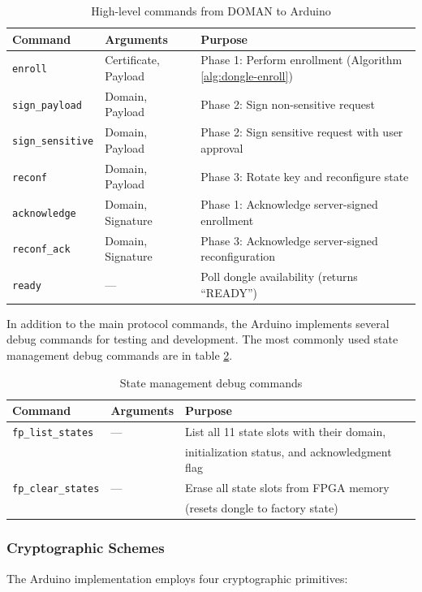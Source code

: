 \begin{table}[ht!]
\centering
\caption{High-level commands from DOMAN to Arduino}
\begin{tabular}{lll}
\hline
\textbf{Command} & \textbf{Arguments} & \textbf{Purpose} \\
\hline
\texttt{enroll} & Certificate, Payload & Phase 1: Perform enrollment (Algorithm \ref{alg:dongle-enroll}) \\
\texttt{sign\_payload} & Domain, Payload & Phase 2: Sign non-sensitive request \\
\texttt{sign\_sensitive} & Domain, Payload & Phase 2: Sign sensitive request with user approval \\
\texttt{reconf} & Domain, Payload & Phase 3: Rotate key and reconfigure state \\
\texttt{acknowledge} & Domain, Signature & Phase 1: Acknowledge server-signed enrollment \\
\texttt{reconf\_ack} & Domain, Signature & Phase 3: Acknowledge server-signed reconfiguration \\
\texttt{ready} & — & Poll dongle availability (returns ``READY'') \\
\hline
\end{tabular}
\label{tab:arduino-commands}
\end{table}



In addition to the main protocol commands, the Arduino implements several debug commands for testing and development. The most commonly used state management debug commands are in table \ref{tab:debug-commands}.

\begin{table}[ht!]
\centering
\caption{State management debug commands}
\begin{tabular}{lll}
\hline
\textbf{Command} & \textbf{Arguments} & \textbf{Purpose} \\
\hline
\texttt{fp\_list\_states} & — & List all 11 state slots with their domain, \\
&  & initialization status, and acknowledgment flag \\
\texttt{fp\_clear\_states} & — & Erase all state slots from FPGA memory \\
&  & (resets dongle to factory state) \\
\hline
\end{tabular}
\label{tab:debug-commands}
\end{table}

\subsubsection{Cryptographic Schemes}
The Arduino implementation employs four cryptographic primitives:

